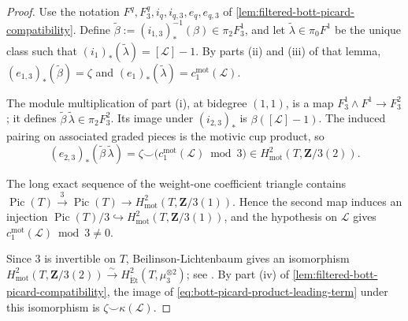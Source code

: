 \documentclass[10pt]{amsart}
\newcommand{\Et}{\mathrm{\acute{E}t}}
\DeclareMathOperator{\Pic}{Pic}
\newcommand{\mot}{\operatorname{mot}}
\theoremstyle{remark}
\begin{document}
\begin{proof}
	Use the notation \(F^q,F^q_3,i_q,i_{q,3},e_q,e_{q,3}\) of
	\cref{lem:filtered-bott-picard-compatibility}. Define
	\(\widetilde\beta:=(i_{1,3})_*^{-1}(\beta)\in\pi_2F^1_3\), and let
	\(\widetilde\lambda\in\pi_0F^1\) be the unique class such that
	\((i_1)_*(\widetilde\lambda)=[\mathcal L]-1\). By parts
	\textup{(ii)} and \textup{(iii)} of that lemma,
	\((e_{1,3})_*(\widetilde\beta)=\zeta\) and
	\((e_1)_*(\widetilde\lambda)=c_1^{\mot}(\mathcal L)\).
	
	The module multiplication of part \textup{(i)}, at bidegree
	\((1,1)\), is a map \(F^1_3\wedge F^1\to F^2_3\); it defines
	\(\widetilde\beta\,\widetilde\lambda\in\pi_2F^2_3\). Its image
	under \((i_{2,3})_*\) is
	\(\beta([\mathcal L]-1)\). The induced pairing on associated graded
	pieces is the motivic cup product, so
	\begin{equation}\label{eq:bott-picard-product-leading-term}
		(e_{2,3})_*(\widetilde\beta\,\widetilde\lambda)=
		\zeta\smile\bigl(c_1^{\mot}(\mathcal L)\bmod3\bigr)
		\in H^2_{\mot}(T,\mathbf Z/3(2)).
	\end{equation}
	
	The long exact sequence of the weight-one coefficient triangle contains
	\(
	\Pic(T)\xrightarrow{3}\Pic(T)\to
	H^2_{\mot}(T,\mathbf Z/3(1))
	\). Hence the second map induces an injection
	\(\Pic(T)/3\hookrightarrow H^2_{\mot}(T,\mathbf Z/3(1))\), and the
	hypothesis on \(\mathcal L\) gives
	\(c_1^{\mot}(\mathcal L)\bmod3\ne0\).
	
	Since \(3\) is invertible on \(T\), Beilinson-Lichtenbaum gives an
	isomorphism
	\(
	H^2_{\mot}(T,\mathbf Z/3(2))\xrightarrow{\sim}
	H^2_{\Et}(T,\mu_3^{\otimes2})
	\); see \cite[Cor.~5.6]{BouisMixedCharacteristicMotivicCohomology}.
	By part \textup{(iv)} of
	\cref{lem:filtered-bott-picard-compatibility}, the image of
	\eqref{eq:bott-picard-product-leading-term} under this isomorphism is
	\(\zeta\smile\kappa(\mathcal L)\).
	

\end{proof}
\end{document}
